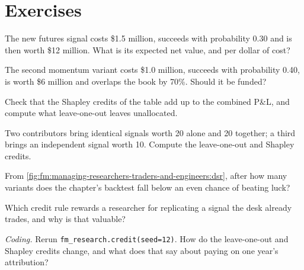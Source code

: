 \section{Exercises}

\begin{exercise}[$\star$]\label{exo:fm:managing-researchers-traders-and-engineers:1}
The new futures signal costs \$1.5 million, succeeds with probability 0.30 and is then worth \$12 million. What is its expected net value, and per
dollar of cost?
\end{exercise}

\begin{exercise}[$\star$]\label{exo:fm:managing-researchers-traders-and-engineers:2}
The second momentum variant costs \$1.0 million, succeeds with probability 0.40, is worth \$6 million and overlaps the book by 70\%. Should it be
funded?
\end{exercise}

\begin{exercise}[$\star$]\label{exo:fm:managing-researchers-traders-and-engineers:3}
Check that the Shapley credits of the table add up to the combined P\&L, and compute what leave-one-out leaves unallocated.
\end{exercise}

\begin{exercise}[$\star\star$]\label{exo:fm:managing-researchers-traders-and-engineers:4}
Two contributors bring identical signals worth 20 alone and 20 together; a third brings an independent signal worth 10. Compute the leave-one-out
and Shapley credits.
\end{exercise}

\begin{exercise}[$\star\star$]\label{exo:fm:managing-researchers-traders-and-engineers:5}
From \cref{fig:fm:managing-researchers-traders-and-engineers:dsr}, after how many variants does the chapter's backtest fall below an even chance of
beating luck?
\end{exercise}

\begin{exercise}[$\star\star$]\label{exo:fm:managing-researchers-traders-and-engineers:6}
Which credit rule rewards a researcher for replicating a signal the desk already trades, and why is that valuable?
\end{exercise}

\begin{exercise}[$\star\star\star$]\label{exo:fm:managing-researchers-traders-and-engineers:7}
\emph{Coding.} Rerun \texttt{fm\_research.credit(seed=12)}. How do the leave-one-out and Shapley credits change, and what does that say about
paying on one year's attribution?
\end{exercise}

